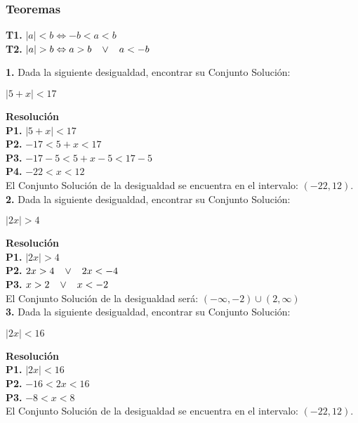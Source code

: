 \documentclass[12pt,a4paper]{book}
\newcommand*\ruleline[1]{\par\noindent\raisebox{.8ex}{\makebox[\linewidth]{\hrulefill\hspace{1ex}\raisebox{-.8ex}{#1}\hspace{1ex}\hrulefill}}}
\begin{document}
{{\subsubsection{Teoremas}
\begin{framed}\noindent
\textbf{T1.} $|a| < b \Leftrightarrow -b < a < b$\\${ }$\\
\textbf{T2.} $|a| > b \Leftrightarrow a>b \hspace{0.3cm} \vee \hspace{0.3cm} a<-b$
\end{framed}
\ruleline{\textbf{Ejemplos}}
\textbf{1.} Dada la siguiente desigualdad, encontrar su Conjunto Solución:
\begin{center}
$|5+x|< 17$
\end{center}
\textbf{Resolución}\\${ }$\\
\textbf{P1.} $|5+x|< 17$ \\
\textbf{P2.} $-17 < 5+x < 17$\\
\textbf{P3.} $-17-5< 5+x-5 < 17-5$\\
\textbf{P4.} $-22 < x < 12$\\${ }$\\
El Conjunto Solución de la desigualdad se encuentra en el intervalo: $(-22,12)$.
\\${ }$\\
\textbf{2.} Dada la siguiente desigualdad, encontrar su Conjunto Solución:
\begin{center}
$|2x|>4$
\end{center}
\textbf{Resolución}\\${ }$\\
\textbf{P1.} $|2x|>4$ \\
\textbf{P2.} $2x>4 \hspace{0.3cm} \vee \hspace{0.3cm} 2x<-4$\\
\textbf{P3.} $x>2 \hspace{0.3cm} \vee \hspace{0.3cm} x<-2$\\${ }$\\
El Conjunto Solución de la desigualdad será: $(-\infty,-2)\cup (2,\infty)$\\${ }$\\
\textbf{3.} Dada la siguiente desigualdad, encontrar su Conjunto Solución:
\begin{center}
$|2x| < 16$
\end{center}
\textbf{Resolución}\\${ }$\\
\textbf{P1.} $|2x| < 16 $ \\
\textbf{P2.} $-16 < 2x < 16$\\
\textbf{P3.} $-8 < x < 8$\\${ }$\\
El Conjunto Solución de la desigualdad se encuentra en el intervalo: $(-22,12)$.
\\${ }$\\



}}
\end{document}
